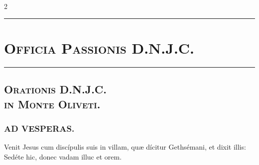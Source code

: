 \documentclass[9pt,twoside]{extarticle}
\begin{document}
\begin{multicols}{2}
\begin{center}\textcolor{red}{\rule{\linewidth}{0.5pt}} \end{center}


\section*{\center \textsc{Officia Passionis D.N.J.C.}}

\begin{center} \textsc{}\end{center}

\begin{center}\textcolor{red}{\rule{\linewidth}{0.5pt}} \end{center}
\subsection*{\center {}}
\subsubsection*{\center {}}
\subsection*{\center \textsc{Orationis D.N.J.C.\\ in Monte Oliveti.}}
\subsubsection*{\center {}}

\subsubsection*{\center \textsc{AD VESPERAS.}}
\begin{tightlist}{}
\item {} Venit Jesus cum discípulis suis in villam, quæ dícitur Gethsémani, et dixit illis: Sedéte hic, donec vadam illuc et orem.
\item {}
\end{tightlist}


\end{multicols}
\end{document}
